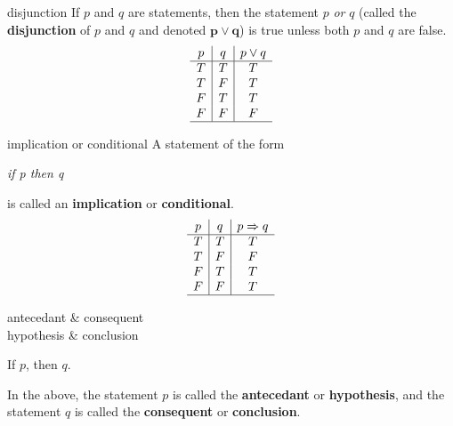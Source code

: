 \documentclass[avery5371,grid]{flashcards}
\begin{document}
\begin{flashcard}[Definition]{disjunction}
If $p$ and $q$ are statements, then the statement $p$ \textit{or} $q$
(called the \textbf{disjunction} of $p$ and $q$ and denoted
$\mathbf{p \vee q}$) is true unless both $p$ and $q$ are false.
\begin{equation*}
\begin{array}{c|c|c}
p & q & p \vee q \\
\hline
T & T & T\\ 
T & F & T\\ 
F & T & T\\ 
F & F & F\\
\hline
\end{array}
\end{equation*}
\end{flashcard}

\begin{flashcard}[Definition]{implication or conditional}
A statement of the form
\begin{center}
 \textit{if p then q}
\end{center}
is called an \textbf{implication} or \textbf{conditional}.
\begin{equation*}
\begin{array}{c|c|c}
p & q & p \Rightarrow q \\
\hline
T & T & T\\ 
T & F & F\\ 
F & T & T\\ 
F & F & T\\
\hline
\end{array}
\end{equation*}
\end{flashcard}

\begin{flashcard}[Definition]{antecedant \& consequent \\
hypothesis \& conclusion}
\begin{center}
If $p$, then $q$.
\end{center}
In the above, the statement $p$ is called the \mbox{\textbf{antecedant}}
or \mbox{\textbf{hypothesis}}, and the statement $q$ is called the
\mbox{\textbf{consequent}} or \mbox{\textbf{conclusion}}.
\end{flashcard}
\end{document}
